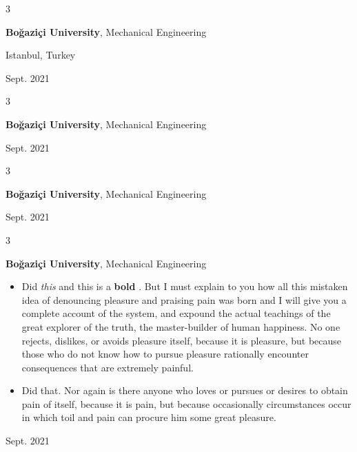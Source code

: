 \documentclass[10pt, letterpaper]{article}
\newenvironment{highlights}{
    \begin{itemize}[
        topsep=0.10 cm,
        parsep=0.10 cm,
        partopsep=0pt,
        itemsep=0pt,
        leftmargin=0.4 cm + 10pt
    ]
}{
    \end{itemize}
} %
\newenvironment{threecolentry}[3][]{
    \onecolentry
    \def\thirdColumn{#3}
    \setcolumnwidth{1 cm, \fill, 4.5 cm}
    \begin{paracol}{3}
    {\raggedright #2} \switchcolumn
}{
    \switchcolumn \raggedleft \thirdColumn
    \end{paracol}
    \endonecolentry
} %
\let\hrefWithoutArrow\href
\renewcommand{\href}[2]{\hrefWithoutArrow{#1}{\mbox{\ifthenelse{\equal{#2}{}}{ }{#2 }\raisebox{.15ex}{\footnotesize \faExternalLink*}}}}
\begin{document}
        \vspace{0.2 cm}

        \begin{threecolentry}{\textbf{}}{
            Istanbul, Turkey

        Sept. 2021
        }
            \textbf{Boğaziçi University}, Mechanical Engineering
        \end{threecolentry}

        \vspace{0.2 cm}

        \begin{threecolentry}{\textbf{}}{
            Sept. 2021
        }
            \textbf{Boğaziçi University}, Mechanical Engineering
        \end{threecolentry}

        \vspace{0.2 cm}

        \begin{threecolentry}{\textbf{}}{
            Sept. 2021
        }
            \textbf{Boğaziçi University}, Mechanical Engineering
        \end{threecolentry}

        \vspace{0.2 cm}

        \begin{threecolentry}{\textbf{}}{
            Sept. 2021
        }
            \textbf{Boğaziçi University}, Mechanical Engineering
            \begin{highlights}
                \item Did \textit{this} and this is a \textbf{bold} \href{https://example.com}{link}. But I must explain to you how all this mistaken idea of denouncing pleasure and praising pain was born and I will give you a complete account of the system, and expound the actual teachings of the great explorer of the truth, the master-builder of human happiness. No one rejects, dislikes, or avoids pleasure itself, because it is pleasure, but because those who do not know how to pursue pleasure rationally encounter consequences that are extremely painful.
                \item Did that. Nor again is there anyone who loves or pursues or desires to obtain pain of itself, because it is pain, but because occasionally circumstances occur in which toil and pain can procure him some great pleasure.
            \end{highlights}
        \end{threecolentry}
\end{document}
